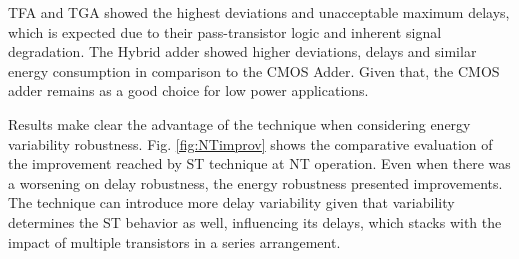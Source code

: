 \documentclass[ecp,tc, english]{iiufrgs}
\begin{document}
TFA and TGA showed the highest deviations and unacceptable maximum delays, which is expected due to their pass-transistor logic and inherent signal degradation. The Hybrid adder showed higher deviations, delays and similar energy consumption in comparison to the CMOS Adder. Given that, the CMOS adder remains as a good choice for low power applications.

Results make clear the advantage of the technique when considering energy variability robustness. Fig. \ref{fig:NTimprov} shows the comparative evaluation of the improvement reached by ST technique at NT operation. Even when there was a worsening on delay robustness, the energy robustness presented improvements. The technique can introduce more delay variability given that variability determines the ST behavior as well, influencing its delays, which stacks with the impact of multiple transistors in a series arrangement.
\end{document}
